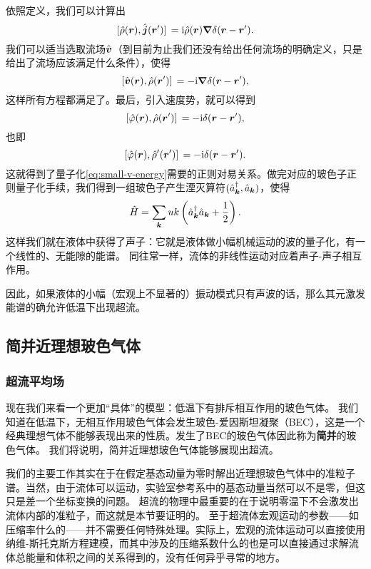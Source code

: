 \documentclass[hyperref, UTF8, a4paper]{ctexart}
\newcommand*{\ii}{\mathrm{i}}
\renewcommand{\emph}{\textbf}
\begin{document}
依照定义，我们可以计算出
\[
    \comm*{\hat{\rho}(\vb*{r})}{\hat{\vb*{j}}(\vb*{r}')} = \ii \hat{\rho}(\vb*{r}) \grad{\delta(\vb*{r} - \vb*{r}')}.
\]
我们可以适当选取流场$\hat{\vb*{v}}$（到目前为止我们还没有给出任何流场的明确定义，只是给出了流场应该满足什么条件），使得
\[
    \comm*{\hat{\vb*{v}}(\vb*{r})}{\hat{\rho}(\vb*{r}')} = - \ii \grad{\delta(\vb*{r} - \vb*{r}')},
\]
这样所有方程都满足了。最后，引入速度势，就可以得到
\[
    \comm*{\hat{\varphi}(\vb*{r})}{\hat{\rho}(\vb*{r}')} = - \ii \delta(\vb*{r} - \vb*{r}'),
\]
也即
\begin{equation}
    \comm*{\hat{\varphi}(\vb*{r})}{\hat{\rho}'(\vb*{r}')} = - \ii \delta(\vb*{r} - \vb*{r}').
\end{equation}
这就得到了量子化\eqref{eq:small-v-energy}需要的正则对易关系。做完对应的玻色子正则量子化手续，我们得到一组玻色子产生湮灭算符$(\hat{a}^\dagger_{\vb*{k}}, \hat{a}_{\vb*{k}})$，使得
\begin{equation}
    \hat{H} = \sum_{\vb*{k}} u k \left( \hat{a}^\dagger_{\vb*{k}} \hat{a}_{\vb*{k}} + \frac{1}{2} \right).
\end{equation}
这样我们就在液体中获得了声子：它就是液体做小幅机械运动的波的量子化，有一个线性的、无能隙的能谱。
同往常一样，流体的非线性运动对应着声子-声子相互作用。

因此，如果液体的小幅（宏观上不显著的）振动模式只有声波的话，那么其元激发能谱的确允许低温下出现超流。

\subsection{简并近理想玻色气体}

\subsubsection{超流平均场}\label{sec:superfluid-mf}

现在我们来看一个更加“具体”的模型：低温下有排斥相互作用的玻色气体。%
我们知道在低温下，无相互作用玻色气体会发生玻色-爱因斯坦凝聚（BEC），这是一个经典理想气体不能够表现出来的性质。发生了BEC的玻色气体因此称为\emph{简并}的玻色气体。
我们将说明，简并近理想玻色气体能够展现出超流。

我们的主要工作其实在于在假定基态动量为零时解出近理想玻色气体中的准粒子谱。当然，由于流体可以运动，实验室参考系中的基态动量当然可以不是零，但这只是差一个坐标变换的问题。
超流的物理中最重要的在于说明零温下不会激发出流体内部的准粒子，而这就是本节要证明的。
至于超流体宏观运动的参数——如压缩率什么的——并不需要任何特殊处理。实际上，宏观的流体运动可以直接使用纳维-斯托克斯方程建模，而其中涉及的压缩系数什么的也是可以直接通过求解流体总能量和体积之间的关系得到的，没有任何异乎寻常的地方。
\end{document}
